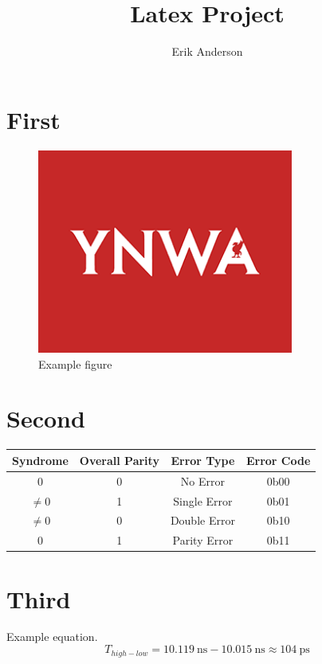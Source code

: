 \documentclass{article}
\title{Latex Project}
\author{Erik Anderson}
\let\Oldsection\section
\renewcommand{\section}{\FloatBarrier\Oldsection}
\begin{document}
\maketitle
\section{First}

\begin{figure}[!hbt]
    \centering
    \caption{Example figure}
    \label{fig:example}
    \includegraphics[width=0.75\textwidth]{figs/ynwa.png}
\end{figure}

\section{Second}
\begin{center}
    \begin{tabularx}{\textwidth}{|c|c|c|c|}
        \caption{Example table}\label{table:example}\\
        \hline
        Syndrome & Overall Parity & Error Type & Error Code \\ 
        \hline
        0 & 0 & No Error & 0b00 \\
        \hline
        $\neq0$ & 1 & Single Error & 0b01 \\
        \hline
        $\neq0$ & 0 & Double Error & 0b10 \\
        \hline
        0 & 1 & Parity Error & 0b11 \\
        \hline
    \end{tabularx}
\end{center}

\section{Third}
Example equation.
\begin{equation}
    T_{high-low} = \SI{10.119}{\nano\second} - \SI{10.015}{\nano\second} 
    \approx \SI{104}{\pico\second} 
\end{equation}
\end{document}
